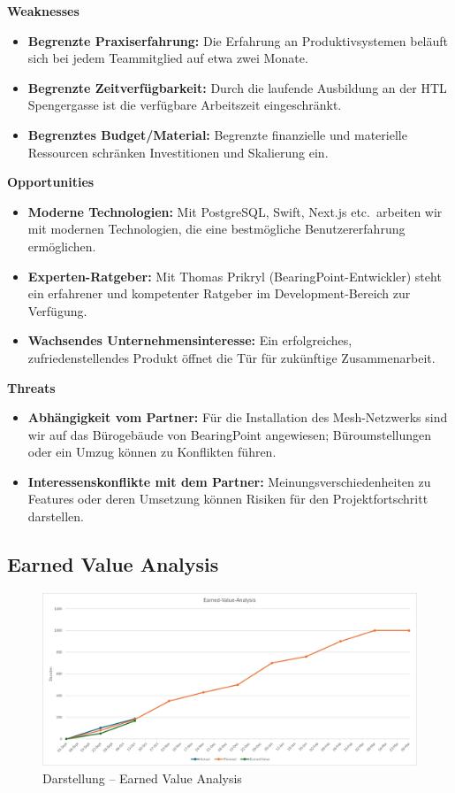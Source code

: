 \documentclass{article}
\begin{document}
\noindent\textbf{Weaknesses}
\begin{itemize}
  \item \textbf{Begrenzte Praxiserfahrung:} Die Erfahrung an Produktivsystemen beläuft sich bei jedem Teammitglied auf etwa zwei Monate.
  \item \textbf{Begrenzte Zeitverfügbarkeit:} Durch die laufende Ausbildung an der HTL Spengergasse ist die verfügbare Arbeitszeit eingeschränkt.
  \item \textbf{Begrenztes Budget/Material:} Begrenzte finanzielle und materielle Ressourcen schränken Investitionen und Skalierung ein.
\end{itemize}

\noindent\textbf{Opportunities}
\begin{itemize}
  \item \textbf{Moderne Technologien:} Mit PostgreSQL, Swift, Next.js etc.\ arbeiten wir mit modernen Technologien, die eine bestmögliche Benutzererfahrung ermöglichen.
  \item \textbf{Experten-Ratgeber:} Mit Thomas Prikryl (BearingPoint-Entwickler) steht ein erfahrener und kompetenter Ratgeber im Development-Bereich zur Verfügung.
  \item \textbf{Wachsendes Unternehmensinteresse:} Ein erfolgreiches, zufriedenstellendes Produkt öffnet die Tür für zukünftige Zusammenarbeit.
\end{itemize}

\noindent\textbf{Threats}
\begin{itemize}
  \item \textbf{Abhängigkeit vom Partner:} Für die Installation des Mesh-Netzwerks sind wir auf das Bürogebäude von BearingPoint angewiesen; Büroumstellungen oder ein Umzug können zu Konflikten führen.
  \item \textbf{Interessenskonflikte mit dem Partner:} Meinungsverschiedenheiten zu Features oder deren Umsetzung können Risiken für den Projektfortschritt darstellen.
\end{itemize}







\subsection{Earned Value Analysis}

\begin{figure}[H]
  \centering
  \includegraphics[width=\textwidth]{EVA.png}
  \caption{Darstellung – Earned Value Analysis}
  \label{fig:eva}
\end{figure}
\end{document}
